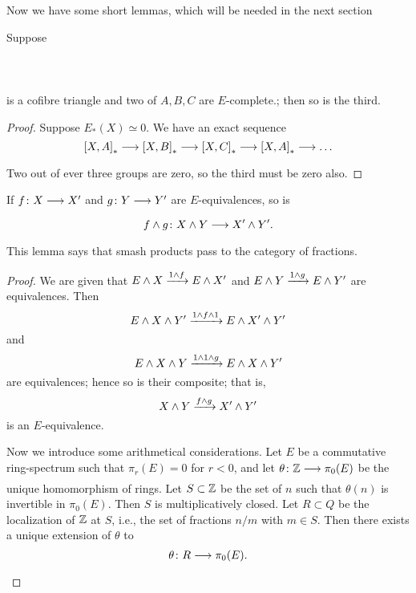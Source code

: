 \documentclass[../main]{subfiles}
\begin{document}
Now we have some short lemmas, which will be needed in the next section
\begin{lemma} \label{lem:p3ch14.15}
Suppose
~\\~\\
~\\~\\
is a cofibre triangle and two of $A,B,C$ are $E$-complete.; then so is the third.

 \begin{proof} 
    Suppose $E_{\ast}(X)\simeq 0.$ We have an exact sequence
    \[
      \left[X,A\right]_{\ast} \lar{} \left[X,B\right]_{\ast} \lar{} \left[X,C\right]_{\ast} \lar{} \left[X,A\right]_{\ast} \lar{} \ldots
    \] 
    Two out of ever three groups are zero, so the third must be zero also.
\end{proof}
\end{lemma}
\begin{lemma} \label{lem:p3ch14.16}
If $f\colon  X \lar{}  X' $ and $g\colon  Y \lar{}  Y' $ are $E$-equivalences, so is 
\[
  f \wedge g \colon X \wedge Y \lar{} X' \wedge Y' .
\] 
This lemma says that smash products pass to the category of fractions.
\begin{proof} 
    We are given that $E \wedge X \vra{1 \wedge f} E \wedge X' $ and $E \wedge Y \vra{1 \wedge g} E \wedge Y'$ are equivalences. Then
    \[
      E \wedge X \wedge Y' \vra{1\wedge f \wedge 1} E \wedge X' \wedge Y' 
    \] 
    and 
    \[
      E \wedge X \wedge Y \vra{1\wedge 1 \wedge g} E \wedge X \wedge Y' 
    \] 
    are equivalences; hence so is their composite; that is,
    \[
    X \wedge Y \vra{f \wedge g} X' \wedge Y'
    \] 
    is an $E$-equivalence.

    Now we introduce some arithmetical considerations. Let $E$ be a commutative ring-spectrum such that $\pi_{r}(E)=0$ for $r < 0$, and let  $\theta\colon  \bZ \lar{}  \pi_{0}(E) $ be the unique homomorphism of rings. Let $S \subset \mathbb{Z}$ be the set of $n$ such that $\theta(n)$ is invertible in $\pi_{0}(E)$. Then $S$ is multiplicatively closed. Let $R \subset Q$ be the localization of $\mathbb{Z}$ at $S$, i.e., the set of fractions $n/ m$ with $m \in  S$. Then there exists a unique extension of $\theta$ to
    \[
      \theta\colon  R \lar{}  \pi_{0}(E) .
    \] 
\end{proof}
\end{lemma}
\end{document}

